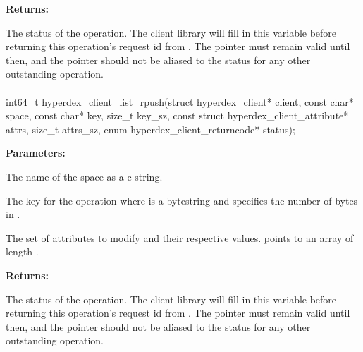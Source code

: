 \noindent\textbf{Returns:}
\begin{description}[labelindent=\widthof{{\code{status}}},leftmargin=*,noitemsep,nolistsep,align=right]
\item[\code{status}] The status of the operation.  The client library will fill in this variable before returning this operation's request id from .  The pointer must remain valid until then, and the pointer should not be aliased to the status for any other outstanding operation.
\end{description}

\paragraph{}
\label{api:c:list_rpush}
\begin{ccode}
int64_t hyperdex_client_list_rpush(struct hyperdex_client* client,
        const char* space,
        const char* key, size_t key_sz,
        const struct hyperdex_client_attribute* attrs, size_t attrs_sz,
        enum hyperdex_client_returncode* status);
\end{ccode}
\funcdesc 

\noindent\textbf{Parameters:}
\begin{description}[labelindent=\widthof{{\code{attrs}, \code{attrs\_sz}}},leftmargin=*,noitemsep,nolistsep,align=right]
\item[\code{space}] The name of the space as a c-string.
\item[\code{key}, \code{key\_sz}] The key for the operation where  is a bytestring and  specifies the number of bytes in .
\item[\code{attrs}, \code{attrs\_sz}] The set of attributes to modify and their respective values.   points to an array of length .
\end{description}

\noindent\textbf{Returns:}
\begin{description}[labelindent=\widthof{{\code{status}}},leftmargin=*,noitemsep,nolistsep,align=right]
\item[\code{status}] The status of the operation.  The client library will fill in this variable before returning this operation's request id from .  The pointer must remain valid until then, and the pointer should not be aliased to the status for any other outstanding operation.
\end{description}

